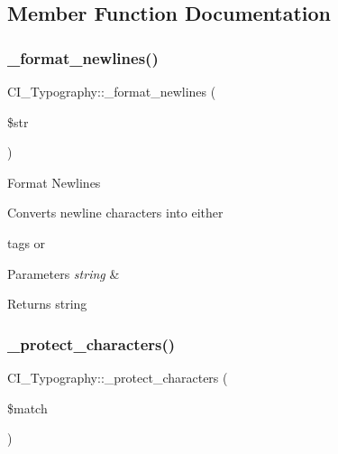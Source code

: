 \subsection{Member Function Documentation}
\mbox{\label{class_c_i___typography_aa3b84cf3b14fe86bad4365e482108814}} 
\subsubsection{\texorpdfstring{\+\_\+format\+\_\+newlines()}{\_format\_newlines()}}
{\footnotesize\ttfamily C\+I\+\_\+\+Typography\+::\+\_\+format\+\_\+newlines (\begin{DoxyParamCaption}\item[{}]{\$str }\end{DoxyParamCaption})\hspace{0.3cm}{\ttfamily [protected]}}

Format Newlines

Converts newline characters into either 

tags or ~\newline



\begin{DoxyParams}{Parameters}
{\em string} & \\
\hline
\end{DoxyParams}
\begin{DoxyReturn}{Returns}
string 
\end{DoxyReturn}
\mbox{\label{class_c_i___typography_a8ba7063a75c8d4c04e6067c98e32d44b}} 
\subsubsection{\texorpdfstring{\+\_\+protect\+\_\+characters()}{\_protect\_characters()}}
{\footnotesize\ttfamily C\+I\+\_\+\+Typography\+::\+\_\+protect\+\_\+characters (\begin{DoxyParamCaption}\item[{}]{\$match }\end{DoxyParamCaption})\hspace{0.3cm}{\ttfamily [protected]}}

